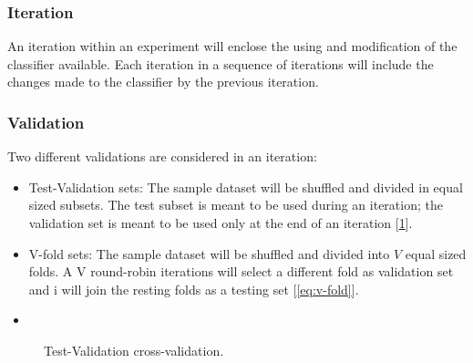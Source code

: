 \documentclass[letterpaper, conference]{IEEEtran}
\begin{document}
\subsubsection{Iteration}
An iteration within an experiment will enclose the using and modification of the classifier available. Each iteration in a sequence of iterations will include the changes made to the classifier by the previous iteration.

\subsubsection{Validation}
Two different validations are considered in an iteration:
\begin{itemize}
  \item Test-Validation sets: The sample dataset will be shuffled and divided in equal sized subsets. The test subset is meant to be used during an iteration; the validation set is meant to be used only at the end of an iteration [\ref{eq:test-validation}].
  \item V-fold sets: The sample dataset will be shuffled and divided into $V$ equal sized folds. A V round-robin iterations will select a different fold as validation set and i will join the resting folds as a testing set [\ref{eq:v-fold}].
  \item 
\end{itemize}

\begin{figure}\label{eq:test-validation}
  \caption{Test-Validation cross-validation.}
\end{figure}
\end{document}
